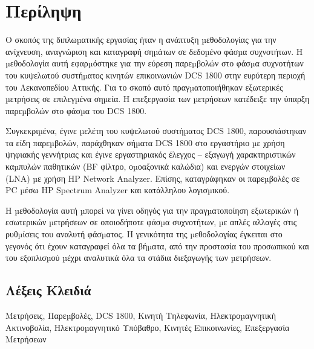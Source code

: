 \maketitle

\blankpagenocount

\examinationpage

\copyrightspage

\RaggedRight
{}


\chapter*{Περίληψη}

Ο σκοπός της διπλωµατικής εργασίας ήταν η ανάπτυξη µεθοδολογίας για την
ανίχνευση, αναγνώριση και καταγραφή σηµάτων σε δεδοµένο φάσµα συχνοτήτων. Η
µεθοδολογία αυτή εφαρµόστηκε για την εύρεση παρεµβολών στο φάσµα συχνοτήτων του
κυψελωτού συστήµατος κινητών επικοινωνιών DCS 1800 στην ευρύτερη περιοχή του
Λεκανοπεδίου Αττικής. Για το σκοπό αυτό πραγµατοποιήθηκαν εξωτερικές µετρήσεις σε
επιλεγµένα σηµεία. Η επεξεργασία των µετρήσεων κατέδειξε την ύπαρξη παρεµβολών στο
φάσµα του DCS 1800.

Συγκεκριµένα, έγινε µελέτη του κυψελωτού συστήµατος DCS 1800, παρουσιάστηκαν
τα είδη παρεµβολών, παράχθηκαν σήµατα DCS 1800 στο εργαστήριο µε χρήση ψηφιακής
γεννήτριας και έγινε εργαστηριακός έλεγχος – εξαγωγή χαρακτηριστικών καµπυλών
παθητικών (BF φίλτρο, οµοαξονικά καλώδια) και ενεργών στοιχείων (LNA) µε χρήση HP
Network Analyzer. Επίσης, καταγράφηκαν οι παρεµβολές σε PC µέσω HP Spectrum
Analyzer και κατάλληλου λογισµικού.

Η µεθοδολογία αυτή µπορεί να γίνει οδηγός για την πραγµατοποίηση εξωτερικών ή
εσωτερικών µετρήσεων σε οποιοδήποτε φάσµα συχνοτήτων, µε απλές αλλαγές στις
ρυθµίσεις του αναλυτή φάσµατος. Η γενικότητα της µεθοδολογίας έγκειται στο γεγονός ότι
έχουν καταγραφεί όλα τα βήµατα, από την προστασία του προσωπικού και του εξοπλισµού
µέχρι αναλυτικά όλα τα στάδια διεξαγωγής των µετρήσεων.


\vspace{20ex}
\section*{Λέξεις Κλειδιά}
Μετρήσεις, Παρεµβολές, DCS 1800, Κινητή Τηλεφωνία, Ηλεκτροµαγνητική Ακτινοβολία,
Ηλεκτροµαγνητικό Υπόβαθρο, Κινητές Επικοινωνίες, Επεξεργασία Μετρήσεων


